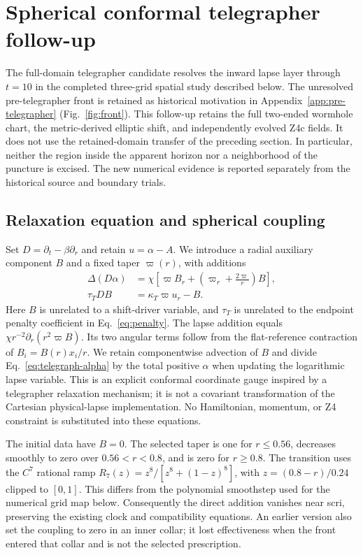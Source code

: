 \section{Spherical conformal telegrapher follow-up}
\label{sec:telegraph}
The full-domain telegrapher candidate resolves the inward lapse layer through $t=10$ in the completed three-grid spatial study described below. The unresolved pre-telegrapher front is retained as historical motivation in Appendix~\ref{app:pre-telegrapher} (Fig.~\ref{fig:front}). This follow-up retains the full two-ended wormhole chart, the metric-derived elliptic shift, and independently evolved Z4c fields. It does not use the retained-domain transfer of the preceding section. In particular, neither the region inside the apparent horizon nor a neighborhood of the puncture is excised. The new numerical evidence is reported separately from the historical source and boundary trials.

\subsection{Relaxation equation and spherical coupling}
Set $D=\partial_t-\beta\partial_r$ and retain $u=\alpha-A$. We introduce a radial auxiliary component $B$ and a fixed taper $\varpi(r)$, with additions
\begin{align}
 \Delta(D\alpha)&=\chi\left[\varpi B_r+
 \left(\varpi_r+\frac{2\varpi}{r}\right)B\right],
 \label{eq:telegraph-alpha}\\
 \tau_T DB&=\kappa_T\varpi u_r-B.
 \label{eq:telegraph-B}
\end{align}
Here $B$ is unrelated to a shift-driver variable, and $\tau_T$ is unrelated to the endpoint penalty coefficient in Eq.~\eqref{eq:penalty}. The lapse addition equals $\chi r^{-2}\partial_r(r^2\varpi B)$. Its two angular terms follow from the flat-reference contraction of $B_i=B(r)x_i/r$. We retain componentwise advection of $B$ and divide Eq.~\eqref{eq:telegraph-alpha} by the total positive $\alpha$ when updating the logarithmic lapse variable. This is an explicit conformal coordinate gauge inspired by a telegrapher relaxation mechanism; it is not a covariant transformation of the Cartesian physical-lapse implementation. No Hamiltonian, momentum, or Z4 constraint is substituted into these equations.

The initial data have $B=0$. The selected taper is one for $r\leq0.56$, decreases smoothly to zero over $0.56<r<0.8$, and is zero for $r\geq0.8$. The transition uses the $C^7$ rational ramp $R_7(z)=z^8/[z^8+(1-z)^8]$, with $z=(0.8-r)/0.24$ clipped to $[0,1]$. This differs from the polynomial smoothstep used for the numerical grid map below. Consequently the direct addition vanishes near scri, preserving the existing clock and compatibility equations. An earlier version also set the coupling to zero in an inner collar; it lost effectiveness when the front entered that collar and is not the selected prescription.

